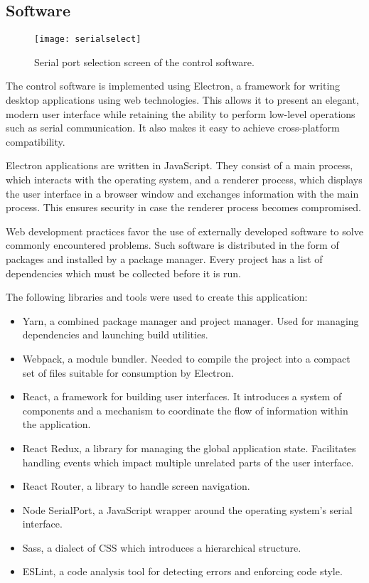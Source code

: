 \clearpage
\subsection{Software}

\begin{figure}[ht]
    \begin{center}
        \texttt{[image: serialselect]}
        \caption{Serial port selection screen of the control software.}
        \label{serialselect}
    \end{center}
\end{figure}

The control software is implemented using Electron, a framework for writing
desktop applications using web technologies. This allows it to present an
elegant, modern user interface while retaining the ability to perform low-level
operations such as serial communication. It also makes it easy to achieve
cross-platform compatibility.

Electron applications are written in JavaScript. They consist of a main process,
which interacts with the operating system, and a renderer process, which
displays the user interface in a browser window and exchanges information with
the main process. This ensures security in case the renderer process becomes
compromised.

Web development practices favor the use of externally developed software to
solve commonly encountered problems. Such software is distributed in the form of
packages and installed by a package manager. Every project has a list of
dependencies which must be collected before it is run.

The following libraries and tools were used to create this application:

\begin{itemize}
    \item Yarn, a combined package manager and project manager. Used for
    managing dependencies and launching build utilities.
    \item Webpack, a module bundler. Needed to compile the project into a
    compact set of files suitable for consumption by Electron.
    \item React, a framework for building user interfaces. It introduces a
    system of components and a mechanism to coordinate the flow of information
    within the application.
    \item React Redux, a library for managing the global application state.
    Facilitates handling events which impact multiple unrelated parts of the
    user interface.
    \item React Router, a library to handle screen navigation.
    \item Node SerialPort, a JavaScript wrapper around the operating system's
    serial interface.
    \item Sass, a dialect of CSS which introduces a hierarchical structure.
    \item ESLint, a code analysis tool for detecting errors and enforcing code
    style.
\end{itemize}

